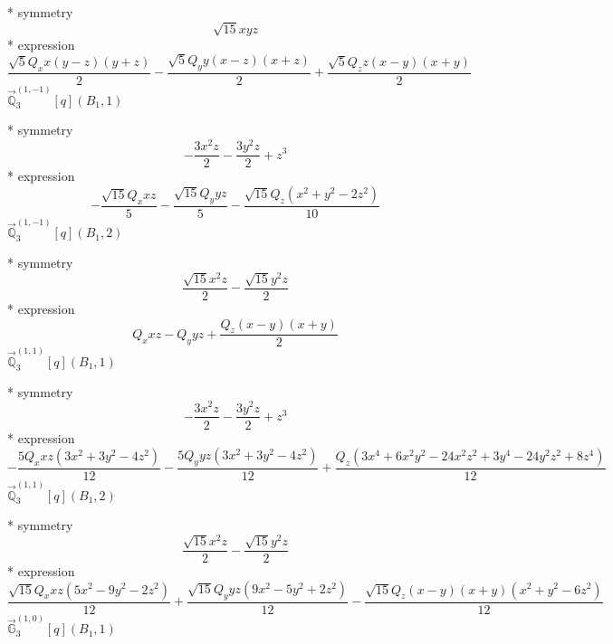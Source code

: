\documentclass[fleqn,8pt]{jsarticle}
\begin{document}
\noindent\quad ** symmetry
\begin{dmath*}
\sqrt{15} x y z
\end{dmath*}
\noindent\quad ** expression
\begin{dmath*}
\frac{\sqrt{5} Q_{x} x \left(y - z\right) \left(y + z\right)}{2} - \frac{\sqrt{5} Q_{y} y \left(x - z\right) \left(x + z\right)}{2} + \frac{\sqrt{5} Q_{z} z \left(x - y\right) \left(x + y\right)}{2}
\end{dmath*}
\noindent\quad $\vec{\mathbb{Q}}_{3}^{(1,-1)}[q](B_{1},1)$

\noindent\quad ** symmetry
\begin{dmath*}
- \frac{3 x^{2} z}{2} - \frac{3 y^{2} z}{2} + z^{3}
\end{dmath*}
\noindent\quad ** expression
\begin{dmath*}
- \frac{\sqrt{15} Q_{x} x z}{5} - \frac{\sqrt{15} Q_{y} y z}{5} - \frac{\sqrt{15} Q_{z} \left(x^{2} + y^{2} - 2 z^{2}\right)}{10}
\end{dmath*}
\noindent\quad $\vec{\mathbb{Q}}_{3}^{(1,-1)}[q](B_{1},2)$

\noindent\quad ** symmetry
\begin{dmath*}
\frac{\sqrt{15} x^{2} z}{2} - \frac{\sqrt{15} y^{2} z}{2}
\end{dmath*}
\noindent\quad ** expression
\begin{dmath*}
Q_{x} x z - Q_{y} y z + \frac{Q_{z} \left(x - y\right) \left(x + y\right)}{2}
\end{dmath*}
\noindent\quad $\vec{\mathbb{Q}}_{3}^{(1,1)}[q](B_{1},1)$

\noindent\quad ** symmetry
\begin{dmath*}
- \frac{3 x^{2} z}{2} - \frac{3 y^{2} z}{2} + z^{3}
\end{dmath*}
\noindent\quad ** expression
\begin{dmath*}
- \frac{5 Q_{x} x z \left(3 x^{2} + 3 y^{2} - 4 z^{2}\right)}{12} - \frac{5 Q_{y} y z \left(3 x^{2} + 3 y^{2} - 4 z^{2}\right)}{12} + \frac{Q_{z} \left(3 x^{4} + 6 x^{2} y^{2} - 24 x^{2} z^{2} + 3 y^{4} - 24 y^{2} z^{2} + 8 z^{4}\right)}{12}
\end{dmath*}
\noindent\quad $\vec{\mathbb{Q}}_{3}^{(1,1)}[q](B_{1},2)$

\noindent\quad ** symmetry
\begin{dmath*}
\frac{\sqrt{15} x^{2} z}{2} - \frac{\sqrt{15} y^{2} z}{2}
\end{dmath*}
\noindent\quad ** expression
\begin{dmath*}
\frac{\sqrt{15} Q_{x} x z \left(5 x^{2} - 9 y^{2} - 2 z^{2}\right)}{12} + \frac{\sqrt{15} Q_{y} y z \left(9 x^{2} - 5 y^{2} + 2 z^{2}\right)}{12} - \frac{\sqrt{15} Q_{z} \left(x - y\right) \left(x + y\right) \left(x^{2} + y^{2} - 6 z^{2}\right)}{12}
\end{dmath*}
\noindent\quad $\vec{\mathbb{G}}_{3}^{(1,0)}[q](B_{1},1)$
\end{document}
